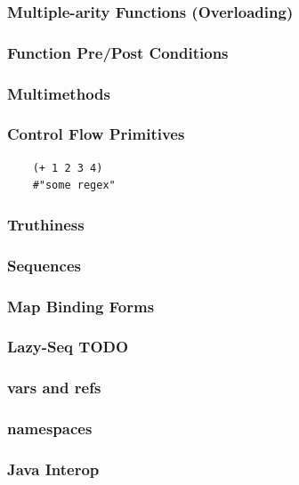 \documentclass{beamer}
\begin{document}
\begin{frame}
  \frametitle{Multiple-arity Functions (Overloading)}
\end{frame}

\begin{frame}
  \frametitle{Function Pre/Post Conditions}
\end{frame}

\begin{frame}
  \frametitle{Multimethods}
\end{frame}

\begin{frame}[fragile]
  \frametitle{Control Flow Primitives}
  \begin{verbatim}
    (+ 1 2 3 4)
    #"some regex"

  \end{verbatim}
\end{frame}

\begin{frame}
%
%
  \frametitle{Truthiness}
\end{frame}


\begin{frame}
  \frametitle{Sequences}
\end{frame}

\begin{frame}
  \frametitle{Map Binding Forms}
\end{frame}

\begin{frame}
  \frametitle{Lazy-Seq TODO}
\end{frame}

\begin{frame}
  \frametitle{vars and refs}
  
\end{frame}

\begin{frame}
  \frametitle{namespaces}
\end{frame}

\begin{frame}
  \frametitle{Java Interop}
  
\end{frame}
\end{document}
